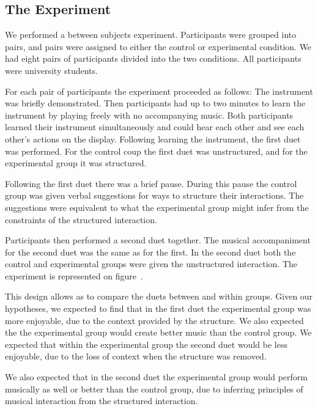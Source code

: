 \documentclass{article}
\begin{document}
\subsection{The Experiment}
We performed a between subjects experiment.  Participants were grouped into pairs, and pairs were assigned to either the control or experimental condition.  We had eight pairs of participants divided into the two conditions. All participants were university students.

For each pair of participants the experiment proceeded as follows: The instrument was briefly demonstrated. Then participants had up to two minutes to learn the instrument by playing freely with no accompanying music.  Both participants learned their instrument simultaneously and could hear each other and see each other's actions on the display.  Following learning the instrument, the first duet was performed.  For the control coup the first duet was unstructured, and for the experimental group it was structured.
 
Following the first duet there was a brief pause.  During this pause the control group was given verbal suggestions for ways to structure their interactions.  The suggestions were equivalent to what the experimental group might infer from the constraints of the structured interaction.

Participants then performed a second duet together.  The musical accompaniment for the second duet was the same as for the first.  In the second duet both the control and experimental groups were given the unstructured interaction. The experiment is represented on figure~\cite{experiment}.

This design allows as to compare the duets between and within groups.  Given our hypotheses, we expected to find that in the first duet the experimental group was more enjoyable, due to the context provided by the structure. We also expected the the experimental group would create better music than the control group. We expected that within the experimental group the second duet would be less enjoyable, due to the loss of context when the structure was removed.  

We also expected that in the second duet the experimental group would perform musically as well or better than the control group, due to inferring principles of musical interaction from the structured interaction.
\end{document}
